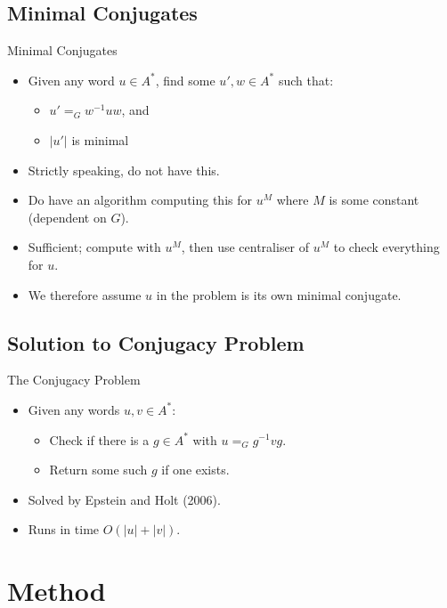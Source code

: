 \documentclass{beamer}
\begin{document}
\subsection{Minimal Conjugates}

\begin{frame}{Minimal Conjugates}
  \begin{itemize}
    \item Given any word $u \in A^*$, find some $u', w \in A^*$ such that:
	\begin{itemize}
	  \item $u' =_G w^{-1}uw$, and
	  \item $|u'|$ is minimal
	\end{itemize}
	\pause
  	\item Strictly speaking, do not have this.
	\pause
	\item Do have an algorithm computing this for $u^M$ where $M$ is some constant (dependent on $G$).
	\item Sufficient; compute with $u^M$, then use centraliser of $u^M$ to check everything for $u$.
	\pause
	\item We therefore assume $u$ in the problem is its own minimal conjugate.
  \end{itemize}
\end{frame}

\subsection{Solution to Conjugacy Problem}

\begin{frame}{The Conjugacy Problem}
  \begin{itemize}
    \item Given any words $u, v \in A^*$:
	\begin{itemize}
	  \item Check if there is a $g \in A^*$ with $u =_G g^{-1}vg$.
	  \item Return some such $g$ if one exists. 
    \end{itemize}
	\pause
	\item Solved by Epstein and Holt (2006).
	\item Runs in time $O(|u| + |v|)$.
  \end{itemize}
\end{frame}

\section{Method}
\end{document}
